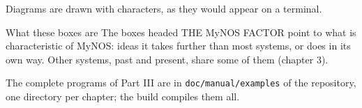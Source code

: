 Diagrams are drawn with characters, as they would appear on a terminal.

\begin{mynosfactor}{What these boxes are}
The boxes headed THE MyNOS FACTOR point to what is characteristic of
MyNOS: ideas it takes further than most systems, or does in its own
way. Other systems, past and present, share some of them (chapter 3).
\end{mynosfactor}

The complete programs of Part III are in \texttt{doc/manual/examples} of
the repository, one directory per chapter; the build compiles them all.
